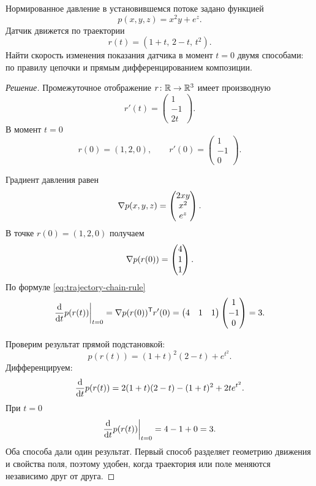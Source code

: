 \begin{problem}
Нормированное давление в установившемся потоке задано функцией
\[
p(x,y,z)=x^2y+e^z.
\]
Датчик движется по траектории
\[
r(t)=(1+t,\,2-t,\,t^2).
\]
Найти скорость изменения показания датчика в момент \(t=0\) двумя способами: по правилу цепочки и прямым дифференцированием композиции.
\end{problem}

\begin{proof}[Решение]
Промежуточное отображение \(r\colon\mathbb{R}\to\mathbb{R}^3\) имеет производную
\[
r'(t)
=
\begin{pmatrix}
1\\
-1\\
2t
\end{pmatrix}.
\]
В момент \(t=0\)
\[
r(0)=(1,2,0),
\qquad
r'(0)=
\begin{pmatrix}
1\\
-1\\
0
\end{pmatrix}.
\]

Градиент давления равен
\[
\nabla p(x,y,z)
=
\begin{pmatrix}
2xy\\
x^2\\
e^z
\end{pmatrix}.
\]
В точке \(r(0)
=(1,2,0)\) получаем
\[
\nabla p(r(0))
=
\begin{pmatrix}
4\\
1\\
1
\end{pmatrix}.
\]
По формуле \eqref{eq:trajectory-chain-rule}
\[
\frac{\mathop{}\!\mathrm{d} }{\mathop{}\!\mathrm{d} t}p(r(t))\bigg|_{t=0}
=
\nabla p(r(0))^{\mathsf{T}}r'(0)
=
\begin{pmatrix}4&1&1\end{pmatrix}
\begin{pmatrix}1\\-1\\0\end{pmatrix}
=3.
\]

Проверим результат прямой подстановкой:
\[
p(r(t))
=(1+t)^2(2-t)+e^{t^2}.
\]
Дифференцируем:
\[
\frac{\mathop{}\!\mathrm{d} }{\mathop{}\!\mathrm{d} t}p(r(t))
=
2(1+t)(2-t)-(1+t)^2+2t e^{t^2}.
\]
При \(t=0\)
\[
\frac{\mathop{}\!\mathrm{d} }{\mathop{}\!\mathrm{d} t}p(r(t))\bigg|_{t=0}
=4-1+0=3.
\]
Оба способа дали один результат. Первый способ разделяет геометрию движения и свойства поля, поэтому удобен, когда траектория или поле меняются независимо друг от друга.
\end{proof}

